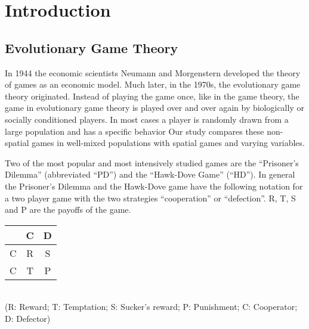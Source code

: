 \section{Introduction}

\subsection{Evolutionary Game Theory}

In 1944 the economic scientists Neumann and Morgenstern developed the theory of games as an economic model. Much later, in the 1970s, the evolutionary game theory originated. Instead of playing the game once, like in the game theory, the game in evolutionary game theory is played over and over again by biologically or socially conditioned players. In most cases a player is randomly drawn from a large population and has a specific behavior \citep{weibull1997} Our study compares these non-spatial games in well-mixed populations with spatial games and varying variables.

Two of the most popular and most intensively studied games are the ``Prisoner's Dilemma'' (abbreviated ``PD'') and the ``Hawk-Dove Game'' (``HD''). In general the Prisoner's Dilemma and the Hawk-Dove game have the following notation for a two player game with the two strategies ``cooperation'' or ``defection''. R, T, S and P are the payoffs of the game.
\newline\\
\begin{tabular}{|c|c|c|}
		\hline  & C & D \\ 
		\hline C & R & S \\ 
		\hline C & T & P \\ 
		\hline 
\end{tabular} \\
(R: Reward; T: Temptation; S: Sucker's reward; P: Punishment; C: Cooperator; D: Defector)


